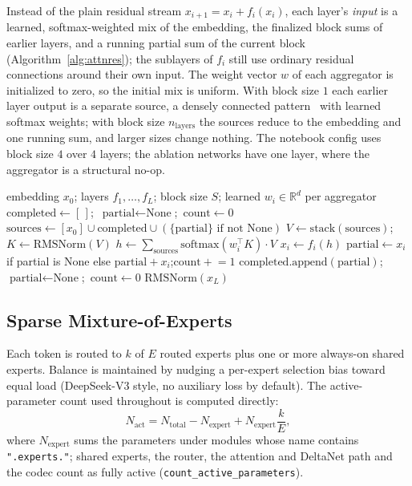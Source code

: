 \documentclass[11pt]{article}
\begin{document}
Instead of the plain residual stream $x_{i+1}=x_i+f_i(x_i)$, each layer's
\emph{input} is a learned, softmax-weighted mix of the embedding, the
finalized block sums of earlier layers, and a running partial sum of the
current block~\citep{kimiteam2026attnres} (Algorithm~\ref{alg:attnres}); the
sublayers of $f_i$ still use ordinary residual connections around their own
input. The weight vector $w$ of each aggregator is initialized to zero, so the
initial mix is uniform. With block size $1$ each earlier layer output is a
separate source, a densely connected pattern~\citep{huang2016densenet} with learned
softmax weights; with block size $n_{\text{layers}}$ the sources reduce to the
embedding and one running sum, and larger sizes change nothing. The notebook config uses
block size $4$ over $4$ layers; the ablation networks have one layer, where
the aggregator is a structural no-op.

\begin{algorithm}[t]
\caption{Block-AttnRes backbone forward}
\label{alg:attnres}
\begin{algorithmic}[1]
\Require embedding $x_0$; layers $f_1,\dots,f_L$; block size $S$; learned $w_i\in\mathbb{R}^d$ per aggregator
\State $\text{completed}\gets[\,]$;\ $\text{partial}\gets\text{None}$;\ $\text{count}\gets0$
  \State $\text{sources}\gets[x_0]\cup\text{completed}\cup(\{\text{partial}\}\text{ if not None})$
  \State $V\gets\text{stack}(\text{sources})$;\quad $K\gets\text{RMSNorm}(V)$
  \State $h\gets\sum_{\text{sources}}\text{softmax}(w_i^{\top}K)\cdot V$ 
  \State $x_i\gets f_i(h)$
  \State $\text{partial}\gets x_i$ if partial is None else $\text{partial}+x_i$;\quad $\text{count}\mathrel{+}=1$
    \State $\text{completed}.\text{append}(\text{partial})$;\ $\text{partial}\gets\text{None}$;\ $\text{count}\gets0$
  \EndIf
\EndFor
\State \Return $\text{RMSNorm}(x_L)$
\end{algorithmic}
\end{algorithm}

\subsection{Sparse Mixture-of-Experts}
\label{sec:moe}

Each token is routed to $k$ of $E$ routed experts plus one or more always-on
shared experts. Balance is maintained by nudging a per-expert selection bias
toward equal load (DeepSeek-V3 style, no auxiliary loss by default). The
active-parameter count used throughout is computed directly:
\begin{equation}
N_{\text{act}}=N_{\text{total}}-N_{\text{expert}}+N_{\text{expert}}\frac{k}{E},
\label{eq:active}
\end{equation}
where $N_{\text{expert}}$ sums the parameters under modules whose name
contains \texttt{".experts."}; shared experts, the router, the attention and
DeltaNet path and the codec count as fully active
(\texttt{count\_active\_parameters}).
\end{document}
